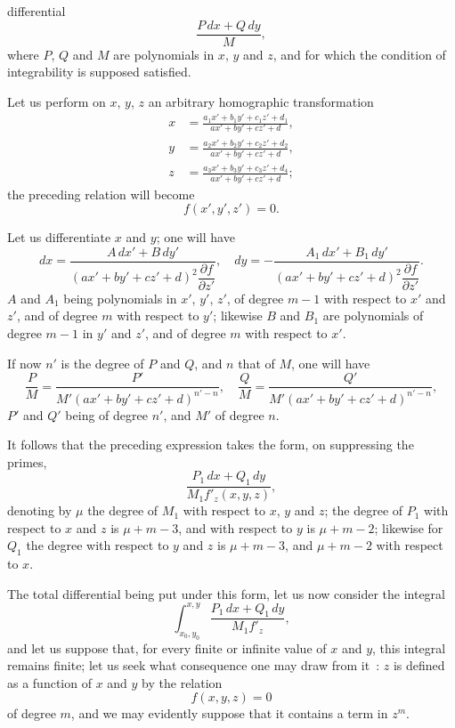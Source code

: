 \documentclass{article}
\begin{document}

differential
\[
\frac{P\,dx + Q\,dy}{M},
\]
where $P$, $Q$ and $M$ are polynomials in $x$, $y$ and $z$, and for which the condition of integrability is supposed satisfied.

Let us perform on $x$, $y$, $z$ an arbitrary homographic transformation
\[
\begin{aligned}
x &= \frac{a_{1}x' + b_{1}y' + c_{1}z' + d_{1}}{ax' + by' + cz' + d},\\
y &= \frac{a_{2}x' + b_{2}y' + c_{2}z' + d_{2}}{ax' + by' + cz' + d},\\
z &= \frac{a_{3}x' + b_{3}y' + c_{3}z' + d_{4}}{ax' + by' + cz' + d};
\end{aligned}
\]
the preceding relation will become
\[
f(x', y', z') = 0.
\]

Let us differentiate $x$ and $y$; one will have
\[
dx = \frac{A\,dx' + B\,dy'}{(ax' + by' + cz' + d)^{2}\dfrac{\partial f}{\partial z'}}, \quad
dy = -\frac{A_{1}\,dx' + B_{1}\,dy'}{(ax' + by' + cz' + d)^{2}\dfrac{\partial f}{\partial z'}}.
\]
$A$ and $A_{1}$ being polynomials in $x'$, $y'$, $z'$, of degree $m - 1$ with respect to $x'$ and $z'$, and of degree $m$ with respect to $y'$; likewise $B$ and $B_{1}$ are polynomials of degree $m - 1$ in $y'$ and $z'$, and of degree $m$ with respect to $x'$.

If now $n'$ is the degree of $P$ and $Q$, and $n$ that of $M$, one will have
\[
\frac{P}{M} = \frac{P'}{M'(ax' + by' + cz' + d)^{n'-n}}, \quad
\frac{Q}{M} = \frac{Q'}{M'(ax' + by' + cz' + d)^{n'-n}},
\]
$P'$ and $Q'$ being of degree $n'$, and $M'$ of degree $n$.

It follows that the preceding expression takes the form, on suppressing the primes,
\[
\frac{P_{1}\,dx + Q_{1}\,dy}{M_{1}f'_{z}(x, y, z)},
\]
denoting by $\mu$ the degree of $M_{1}$ with respect to $x$, $y$ and $z$; the degree
of $P_{1}$ with respect to $x$ and $z$ is $\mu + m - 3$, and with respect to $y$ is $\mu + m - 2$; likewise for $Q_{1}$ the degree with respect to $y$ and $z$ is $\mu + m - 3$, and $\mu + m - 2$ with respect to $x$.

The total differential being put under this form, let us now consider the integral
\[
\int_{x_{0}, y_{0}}^{x, y} \frac{P_{1}\,dx + Q_{1}\,dy}{M_{1}f'_{z}},
\]
and let us suppose that, for every finite or infinite value of $x$ and $y$, this integral remains finite; let us seek what consequence one may draw from it~: $z$ is defined as a function of $x$ and $y$ by the relation
\[
f(x, y, z) = 0
\]
of degree $m$, and we may evidently suppose that it contains a term in $z^{m}$.
\end{document}
